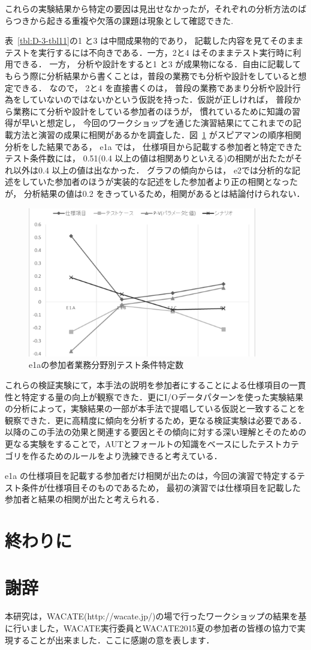 これらの実験結果から特定の要因は見出せなかったが，それぞれの分析方法のばらつきから起きる重複や欠落の課題は現象として確認できた.

表~\ref{tbl:D-3-tbl11}の1 と3 は中間成果物的であり， 記載した内容を見てそのままテストを実行するには不向きである．一方，2と4 はそのままテスト実行時に利用できる． 一方， 分析や設計をすると1 と3 が成果物になる．自由に記載してもらう際に分析結果から書くことは，普段の業務でも分析や設計をしていると想定できる． なので， 2と4 を直接書くのは， 普段の業務であまり分析や設計行為をしていないのではないかという仮説を持った．仮説が正しければ， 普段から業務にて分析や設計をしている参加者のほうが， 慣れているために知識の習得が早いと想定し， 今回のワークショップを通じた演習結果にてこれまでの記載方法と演習の成果に相関があるかを調査した．図~\ref{fig:D-3-Fig13} がスピアマンの順序相関分析をした結果である， e1a では， 仕様項目から記載する参加者と特定できたテスト条件数には， 0.51(0.4 以上の値は相関ありといえる)の相関が出たたがそれ以外は0.4 以上の値は出なかった． グラフの傾向からは， e2では分析的な記述をしていた参加者のほうが実装的な記述をした参加者より正の相関となったが， 分析結果の値は0.2 をきっているため，相関があるとは結論付けられない．
\begin{figure}[h]
  \begin{center}
  \includegraphics[width=10cm]{./image/D-3-Fig13.png}
  \caption{e1aの参加者業務分野別テスト条件特定数}
  \label{fig:D-3-Fig13}
  \end{center}
   \end{figure}


これらの検証実験にて，本手法の説明を参加者にすることによる仕様項目の一貫性と特定する量の向上が観察できた．更にI/Oデータパターンを使った実験結果の分析によって，実験結果の一部が本手法で提唱している仮説と一致することを観察できた．更に高精度に傾向を分析するため，更なる検証実験は必要である．以降のこの手法の効果と関連する要因とその傾向に対する深い理解とそのための更なる実験をすることで，AUTとフォールトの知識をベースにしたテストカテゴリを作るためのルールをより洗練できると考えている．

e1a の仕様項目を記載する参加者だけ相関が出たのは，今回の演習で特定するテスト条件が仕様項目そのものであるため， 最初の演習では仕様項目を記載した参加者と結果の相関が出たと考えられる．

\section{終わりに}
\section{謝辞}
本研究は，WACATE(http://wacate.jp/)の場で行ったワークショップの結果を基に行いました，WACATE実行委員とWACATE2015夏の参加者の皆様の協力で実現することが出来ました．ここに感謝の意を表します．
